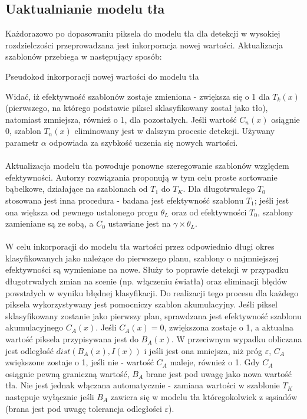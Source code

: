 \subsection{Uaktualnianie modelu tła}
Każdorazowo po dopasowaniu piksela do modelu tła dla detekcji w wysokiej rozdzielczości przeprowadzana jest inkorporacja nowej wartości. Aktualizacja szablonów przebiega w następujący sposób:
\begin{algorithm}[H]
  
 \caption{Pseudokod inkorporacji nowej wartości do modelu tła}
\end{algorithm}
 Widać, iż efektywność szablonów zostaje zmieniona - zwiększa się o 1 dla $T_{k}(x)$ (pierwszego, na którego podstawie piksel sklasyfikowany został jako tło), natomiast zmniejsza, również o 1, dla pozostałych. Jeśli wartość $C_{n}(x)$ osiągnie 0, szablon $T_{n}(x)$ eliminowany jest w dalszym procesie detekcji. Używany parametr $\alpha$ odpowiada za szybkość uczenia się nowych wartości. 
 \paragraph{}
Aktualizacja modelu tła powoduje ponowne szeregowanie szablonów względem efektywności. Autorzy rozwiązania proponują w tym celu proste sortowanie bąbelkowe, działające na szablonach od $T_{1}$ do $T_{K}$. Dla długotrwałego $T_{0}$ stosowana jest inna procedura - badana jest efektywność szablonu $T_{1}$; jeśli jest ona większa od pewnego ustalonego progu $\theta_{L}$ oraz od efektywności $T_{0}$, szablony zamieniane są ze sobą, a $C_{0}$ ustawiane jest na $\gamma \times \theta_{L}$.
\paragraph{}
W celu inkorporacji do modelu tła wartości przez odpowiednio długi okres klasyfikowanych jako należące do pierwszego planu, szablony o najmniejszej efektywności są wymieniane na nowe. Służy to poprawie detekcji w przypadku długotrwałych zmian na scenie (np. włączeniu światła) oraz eliminacji błędów powstałych w wyniku błędnej klasyfikacji. Do realizacji tego procesu dla każdego piksela wykorzystywany jest pomocniczy szablon akumulacyjny. Jeśli piksel sklasyfikowany zostanie jako pierwszy plan, sprawdzana jest efektywność szablonu akumulacyjnego $C_{A}(x)$. Jeśli $C_{A}(x)=0$, zwiększona zostaje o 1, a aktualna wartość piksela przypisywana jest do $B_{A}(x)$. W przeciwnym wypadku obliczana jest odległość $dist(B_{A}(x),I(x))$ i jeśli jest ona mniejsza, niż próg $\varepsilon$, $C_{A}$ zwiększone zostaje o 1, jeśli nie - wartość $C_{A}$ maleje, również o 1. Gdy $C_{A}$ osiągnie pewną graniczną wartość, $B_{A}$ brane jest pod uwagę jako nowa wartość tła. Nie jest jednak włączana automatycznie - zamiana wartości w szablonie $T_{K}$ następuje wyłącznie jeśli $B_{A}$ zawiera się w modelu tła któregokolwiek z sąsiadów (brana jest pod uwagę tolerancja odległości $\varepsilon$).
